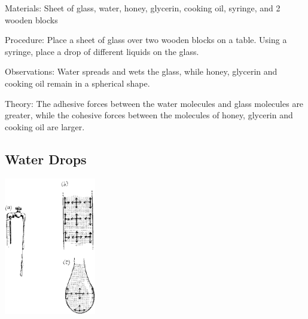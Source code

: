 \begin{multicols}{2}
\begin{description*}
\item[Materials:]{Sheet of glass, water, honey, glycerin, cooking oil, syringe, and 2 wooden blocks}
\item[Procedure:]{Place a sheet of glass over two wooden blocks on a table. Using a syringe, place a drop of different liquids on the glass.}
\item[Observations:]{Water spreads and wets the glass, while honey, glycerin and cooking oil remain in a spherical shape.}
\item[Theory:]{The adhesive forces between the water molecules and glass molecules are greater, while the cohesive forces between the molecules of honey, glycerin and cooking oil are larger.}
\end{description*}

\subsection{Water Drops}

\begin{center}
\includegraphics[width=0.3\textwidth]{./img/source/water-drops.png}
\end{center}


\end{multicols}
